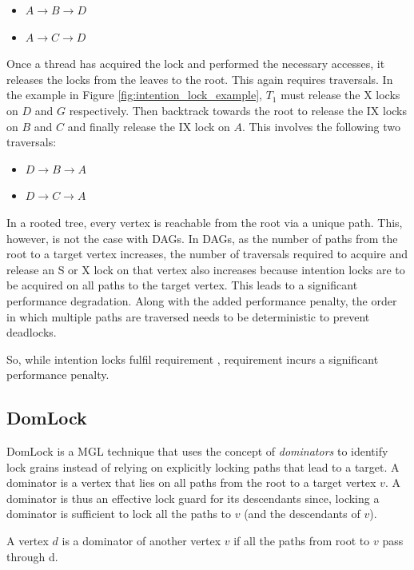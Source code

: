 \begin{itemize}
    \item $A \rightarrow B \rightarrow D$
    \item $A \rightarrow C \rightarrow D$
\end{itemize}

Once a thread has acquired the lock and performed the necessary accesses, it releases the locks from the leaves to the root. This again requires traversals. In the example in Figure \ref{fig:intention_lock_example}, $T_1$ must release the X locks on $D$ and $G$ respectively. Then backtrack towards the root to release the IX locks on $B$ and $C$ and finally release the IX lock on $A$. This involves the following two traversals:

\begin{itemize}
    \item $D \rightarrow B \rightarrow A$
    \item $D \rightarrow C \rightarrow A$
\end{itemize}




In a rooted tree, every vertex is reachable from the root via a unique path. 
This, however, is not the case with DAGs.
In DAGs, as the number of paths from the root to a target vertex increases, the number of traversals required to acquire and release an S or X lock on that vertex also increases because intention locks are to be acquired on all paths to the target vertex.
This leads to a significant performance degradation. Along with the added performance penalty, the order in which multiple paths are traversed needs to be deterministic to prevent deadlocks.  

So, while intention locks fulfil requirement \Rb, requirement \Rc incurs a significant performance penalty. 

\subsection{DomLock}
DomLock \cite{kalikar2016domlock} is a MGL technique that uses the concept of \emph{dominators} to identify lock grains instead of relying on explicitly locking paths that lead to a target. A dominator is a vertex that lies on all paths from the root to a target vertex $v$. A dominator is thus an effective lock guard for its descendants since, locking a dominator is sufficient to lock all the paths to $v$ (and the descendants of $v$).

\begin{definition}[Dominator]
    A vertex $d$ is a dominator of another vertex $v$ if all the paths from root to $v$ pass through d.
\end{definition}

